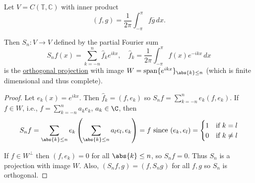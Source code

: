 \documentclass{article}
\DeclareMathOperator{\spn}{span}
\begin{document}
\begin{eg}
    Let $V = C(\mathbb{T}, \mathbb{C})$ with inner product
    \begin{equation*}
        (f, g) = \frac{1}{2\pi} \int_{-\pi}^\pi f \overline{g} \, dx.
    \end{equation*}

    Then $S_n : V \to V$ defined by the partial Fourier sum
    \begin{equation*}
        S_n f(x) = \sum_{k=-n}^n \hat{f}_k e^{ikx}, \quad \hat{f}_k = \frac{1}{2\pi} \int_{-\pi}^\pi f(x) e^{-ikx} \, dx
    \end{equation*}
    is the \hyperlink{def:proj}{orthogonal projection} with image $W = \spn \{e^{ikx}\}_{\abs{k}\leq n}$ (which is finite dimensional and thus complete).
\end{eg}

\begin{proof}
    Let $e_k(x) = e^{ikx}$. Then $\hat{f}_k = (f, e_k)$ so $S_n f = \sum_{k = -n}^n e_k(f, e_k)$.
    If $f \in W$, i.e., $f = \sum_{k=-n}^n a_k e_k$, $a_k \in \C$, then
    \begin{equation*}
        S_n f = \sum_{\abs{k} \leq n} e_k \left(\sum_{\abs{k}\leq n} a_l e_l, e_k\right) = f \text{ since } (e_k, e_l) =
        \begin{cases}
            1 & \text{if } k = l \\
            0 & \text{if } k \neq l
        \end{cases}
    \end{equation*}

    If $f \in W^\perp$ then $(f, e_k) = 0$ for all $\abs{k} \leq n$, so $S_n f= 0$.
    Thus $S_n$ is a projection with image $W$.
    Also, $(S_n f, g) = (f, S_n g)$ for all $f,g$ so $S_n$ is orthogonal.
\end{proof}

\end{document}
